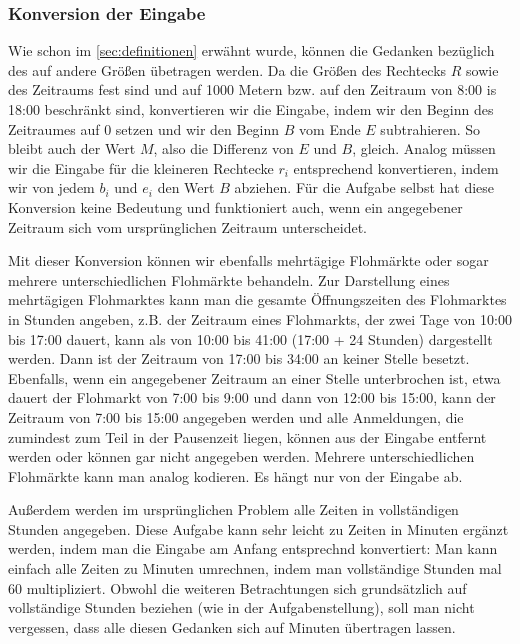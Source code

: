 \subsubsection{Konversion der Eingabe}
Wie schon im \cref{sec:definitionen} erwähnt wurde, können die Gedanken bezüglich des
\fp{} auf andere Größen übetragen werden. Da die Größen des Rechtecks $R$ sowie des Zeitraums fest sind
und auf 1000 Metern bzw. auf den Zeitraum von 8:00 is 18:00 beschränkt sind, konvertieren wir
die Eingabe, indem wir den Beginn des Zeitraumes auf 0 setzen und wir den 
Beginn $B$ vom Ende $E$ subtrahieren.
So bleibt auch der Wert $M$, also die Differenz von $E$ und $B$, gleich. 
Analog müssen wir die Eingabe für die kleineren Rechtecke $r_i$ entsprechend konvertieren, indem wir
von jedem $b_i$ und $e_i$ den Wert $B$ abziehen. Für die Aufgabe selbst hat diese Konversion keine
Bedeutung und funktioniert auch, wenn ein angegebener Zeitraum sich vom ursprünglichen Zeitraum unterscheidet.

Mit dieser Konversion können wir ebenfalls mehrtägige Flohmärkte oder
sogar mehrere unterschiedlichen Flohmärkte behandeln.
Zur Darstellung eines mehrtägigen Flohmarktes kann man die gesamte Öffnungszeiten des Flohmarktes in Stunden angeben,
z.B. der Zeitraum eines Flohmarkts, der zwei Tage von 10:00 bis 17:00 dauert,
kann als von 10:00 bis 41:00 (17:00 + 24 Stunden) dargestellt werden. 
Dann ist der Zeitraum von 17:00 bis 34:00 an keiner Stelle besetzt.
Ebenfalls, wenn ein angegebener Zeitraum an einer Stelle unterbrochen ist,
etwa dauert der Flohmarkt von 7:00 bis 9:00 und dann von 12:00 bis 15:00, kann der
Zeitraum von 7:00 bis 15:00 angegeben werden und alle Anmeldungen, die zumindest zum Teil
in der Pausenzeit liegen, können aus der Eingabe entfernt werden oder können gar nicht
angegeben werden.
Mehrere unterschiedlichen Flohmärkte kann man analog kodieren. Es hängt nur von der Eingabe ab.


Außerdem werden im ursprünglichen Problem alle Zeiten in vollständigen Stunden angegeben.
Diese Aufgabe kann sehr leicht zu Zeiten in Minuten ergänzt werden, indem man die Eingabe
am Anfang entsprechnd konvertiert: Man kann einfach alle Zeiten zu Minuten umrechnen, indem
man vollständige Stunden mal 60 multipliziert.
Obwohl die weiteren Betrachtungen sich grundsätzlich auf vollständige Stunden beziehen
(wie in der Aufgabenstellung),
soll man nicht vergessen, dass alle diesen Gedanken sich auf Minuten übertragen lassen.